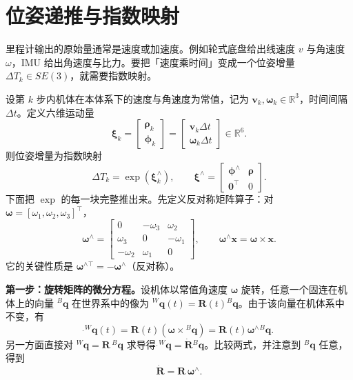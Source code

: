 \section{位姿递推与指数映射}\label{sec:04-exp}

里程计输出的原始量通常是速度或加速度。例如轮式底盘给出线速度 $v$ 与角速度 $\omega$，IMU 给出角速度与比力。要把「速度乘时间」变成一个位姿增量 $\Delta T_{k}\in SE(3)$，就需要指数映射。

设第 $k$ 步内机体在本体系下的速度与角速度为常值，记为 $\bm{v}_{k},\bm{\omega}_{k}\in\mathbb{R}^{3}$，时间间隔 $\Delta t$。定义六维运动量
\begin{equation}
  \bm{\xi}_{k} = \begin{bmatrix} \bm{\rho}_{k} \\ \bm{\phi}_{k}\end{bmatrix}
  = \begin{bmatrix} \bm{v}_{k}\Delta t \\ \bm{\omega}_{k}\Delta t\end{bmatrix}
  \in\mathbb{R}^{6}.
  \label{eq:04-xi}
\end{equation}
则位姿增量为指数映射
\begin{equation}
  \Delta T_{k} = \exp\left(\bm{\xi}_{k}^{\wedge}\right),
  \qquad
  \bm{\xi}^{\wedge} = \begin{bmatrix} \bm{\phi}^{\wedge} & \bm{\rho}\\ \bm{0}^{\top} & 0\end{bmatrix}.
  \label{eq:04-exp-se3}
\end{equation}
下面把 $\exp$ 的每一块完整推出来。先定义反对称矩阵算子：对 $\bm{\omega}=[\omega_1,\omega_2,\omega_3]^{\top}$，
\begin{equation}
  \bm{\omega}^{\wedge} = \begin{bmatrix}
    0 & -\omega_3 & \omega_2\\
    \omega_3 & 0 & -\omega_1\\
    -\omega_2 & \omega_1 & 0
  \end{bmatrix},
  \qquad
  \bm{\omega}^{\wedge}\bm{x} = \bm{\omega}\times\bm{x}.
  \label{eq:04-skew}
\end{equation}
它的关键性质是 $\bm{\omega}^{\wedge\top} = -\bm{\omega}^{\wedge}$（反对称）。

\textbf{第一步：旋转矩阵的微分方程。}设机体以常值角速度 $\bm{\omega}$ 旋转，任意一个固连在机体上的向量 ${}^{B}\bm{q}$ 在世界系中的像为 ${}^{W}\bm{q}(t)=\bm{R}(t){}^{B}\bm{q}$。由于该向量在机体系中不变，有
\begin{equation}
  \dot{}^{W}\bm{q}(t) = \bm{R}(t)\left(\bm{\omega}\times{}^{B}\bm{q}\right)
  = \bm{R}(t)\bm{\omega}^{\wedge}{}^{B}\bm{q}.
\end{equation}
另一方面直接对 ${}^{W}\bm{q}=\bm{R}\,{}^{B}\bm{q}$ 求导得 $\dot{}^{W}\bm{q}=\dot{\bm{R}}{}^{B}\bm{q}$。比较两式，并注意到 ${}^{B}\bm{q}$ 任意，得到
\begin{equation}
  \dot{\bm{R}} = \bm{R}\,\bm{\omega}^{\wedge}.
  \label{eq:04-rdot}
\end{equation}

